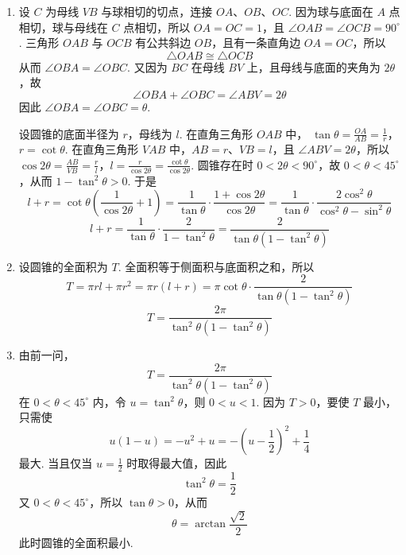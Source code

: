 \begin{solution}
\begin{enumerate}
\item 设 \(C\) 为母线 \(VB\) 与球相切的切点，连接 \(OA\)、\(OB\)、\(OC\). 因为球与底面在 \(A\) 点相切，球与母线在 \(C\) 点相切，所以
\(OA=OC=1\)，且 \(\angle OAB=\angle OCB=90^\circ\).
三角形 \(OAB\) 与 \(OCB\) 有公共斜边 \(OB\)，且有一条直角边 \(OA=OC\)，所以
\[
\triangle OAB\cong\triangle OCB
\]
从而 \(\angle OBA=\angle OBC\). 又因为 \(BC\) 在母线 \(BV\) 上，且母线与底面的夹角为 \(2\theta\)，故
\[
\angle OBA+\angle OBC=\angle ABV=2\theta
\]
因此 \(\angle OBA=\angle OBC=\theta\).

设圆锥的底面半径为 \(r\)，母线为 \(l\). 在直角三角形 \(OAB\) 中，
\(\tan\theta=\frac{OA}{AB}=\frac1r\)，\(r=\cot\theta\).
在直角三角形 \(VAB\) 中，\(AB=r\)、\(VB=l\)，且 \(\angle ABV=2\theta\)，所以
\(\cos2\theta=\frac{AB}{VB}=\frac rl\)，\(l=\frac{r}{\cos2\theta}=\frac{\cot\theta}{\cos2\theta}\).
圆锥存在时 \(0<2\theta<90^\circ\)，故 \(0<\theta<45^\circ\)，从而 \(1-\tan^2\theta>0\). 于是
\[
l+r=\cot\theta\left(\frac{1}{\cos2\theta}+1\right)
=\frac{1}{\tan\theta}\cdot\frac{1+\cos2\theta}{\cos2\theta}
=\frac{1}{\tan\theta}\cdot\frac{2\cos^2\theta}{\cos^2\theta-\sin^2\theta}
\]
\[
l+r=\frac{1}{\tan\theta}\cdot\frac{2}{1-\tan^2\theta}
=\frac{2}{\tan\theta\left(1-\tan^2\theta\right)}
\]

\item 设圆锥的全面积为 \(T\). 全面积等于侧面积与底面积之和，所以
\[
T=\pi rl+\pi r^2
=\pi r\left(l+r\right)
=\pi\cot\theta\cdot\frac{2}{\tan\theta\left(1-\tan^2\theta\right)}
\]
\[
T=\frac{2\pi}{\tan^2\theta\left(1-\tan^2\theta\right)}
\]

\item 由前一问，
\[
T=\frac{2\pi}{\tan^2\theta\left(1-\tan^2\theta\right)}
\]
在 \(0<\theta<45^\circ\) 内，令 \(u=\tan^2\theta\)，则 \(0<u<1\). 因为 \(T>0\)，要使 \(T\) 最小，只需使
\[
u(1-u)=-u^2+u=-\left(u-\frac12\right)^2+\frac14
\]
最大. 当且仅当 \(u=\frac12\) 时取得最大值，因此
\[
\tan^2\theta=\frac12
\]
又 \(0<\theta<45^\circ\)，所以 \(\tan\theta>0\)，从而
\[
\theta=\arctan\frac{\sqrt2}{2}
\]
此时圆锥的全面积最小.
\end{enumerate}
\end{solution}
